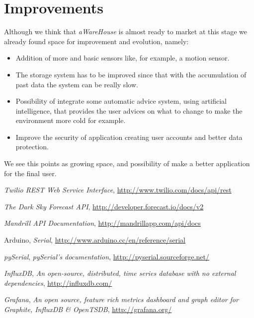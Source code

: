 \documentclass[12pt]{report}
\begin{document}
\newpage
\chapter{Improvements}

Although we think that \textit{aWareHouse} is almost ready to market at this stage we already found space for improvement and evolution, namely:
\begin{itemize}
 \item Addition of more and basic sensors like, for example, a motion sensor.
 \item The storage system has to be improved since that with the accumulation of past data the system can be really slow.
 \item Possibility of integrate some automatic advice system, using artificial intelligence, that provides the user advices on what to change to make the environment more cold for example.
 \item Improve the security of application creating user accounts and better data protection.
\end{itemize} 

We see this points as growing space, and possibility of make a better application for the final user.

\renewcommand\bibname{References}
\begin{thebibliography}{}

  \emph{Twilio REST Web Service Interface},
  \url{http://www.twilio.com/docs/api/rest}
  
  \emph{The Dark Sky Forecast API},
  \url{http://developer.forecast.io/docs/v2}
  
  \emph{Mandrill API Documentation},
  \url{http://mandrillapp.com/api/docs}
  
  Arduino, \emph{Serial},
  \url{http://www.arduino.cc/en/reference/serial}
  
  \textit{pySerial}, \emph{pySerial’s documentation},
  \url{http://pyserial.sourceforge.net/}
  
  \textit{InfluxDB}, \emph{An open-source, distributed, time series database
with no external dependencies},
  \url{http://influxdb.com/}
  
  \textit{Grafana}, \emph{An open source, feature rich metrics dashboard and graph editor for
Graphite, InfluxDB \& OpenTSDB},
  \url{http://grafana.org/}
\end{thebibliography}
\end{document}
